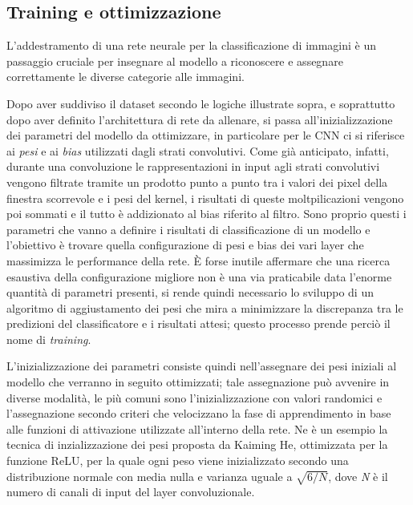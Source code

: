 \subsection{Training e ottimizzazione}

L'addestramento di una rete neurale per la classificazione di immagini è un passaggio cruciale per insegnare al modello a riconoscere e assegnare correttamente le diverse categorie alle immagini.

Dopo aver suddiviso il dataset secondo le logiche illustrate sopra, e soprattutto dopo aver definito l'architettura di rete da allenare, si passa all'inizializzazione dei parametri del modello da ottimizzare, in particolare per le CNN ci si riferisce ai \textit{pesi} e ai \textit{bias} utilizzati dagli strati convolutivi. Come già anticipato, infatti, durante una convoluzione le rappresentazioni in input agli strati convolutivi vengono filtrate tramite un prodotto punto a punto tra i valori dei pixel della finestra scorrevole e i pesi del kernel, i risultati di queste moltpilicazioni vengono poi sommati e il tutto è addizionato al bias riferito al filtro. Sono proprio questi i parametri che vanno a definire i risultati di classificazione di un modello e l'obiettivo è trovare quella configurazione di pesi e bias dei vari layer che massimizza le performance della rete. È forse inutile affermare che una ricerca esaustiva della configurazione migliore non è una via praticabile data l'enorme quantità di parametri presenti, si rende quindi necessario lo sviluppo di un algoritmo di aggiustamento dei pesi che mira a minimizzare la discrepanza tra le predizioni del classificatore e i risultati attesi; questo processo prende perciò il nome di \textit{training}.

L'inizializzazione dei parametri consiste quindi nell'assegnare dei pesi iniziali al modello che verranno in seguito ottimizzati; tale assegnazione può avvenire in diverse modalità, le più comuni sono l'inizializzazione con valori randomici e l'assegnazione secondo criteri che velocizzano la fase di apprendimento in base alle funzioni di attivazione utilizzate all'interno della rete. Ne è un esempio la tecnica di inzializzazione dei pesi proposta da Kaiming He, ottimizzata per la funzione ReLU, per la quale ogni peso viene inizializzato secondo una distribuzione normale con media nulla e varianza uguale a $\sqrt{6/N}$, dove \textit{N} è il numero di canali di input del layer convoluzionale.
\cite{1502.01852}

